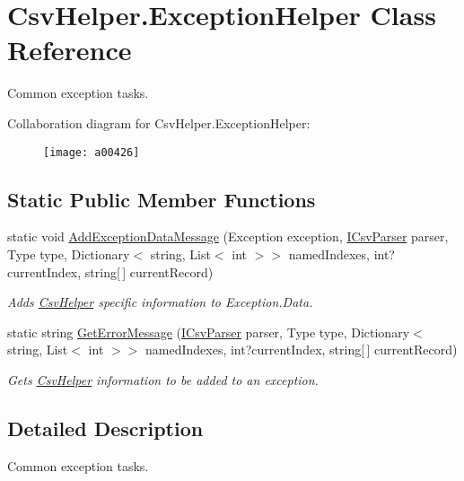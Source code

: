 \hypertarget{a00100}{\section{Csv\-Helper.\-Exception\-Helper Class Reference}
\label{a00100}
}


Common exception tasks.  




Collaboration diagram for Csv\-Helper.\-Exception\-Helper\-:
\nopagebreak
\begin{figure}[H]
\begin{center}
\leavevmode
\texttt{[image: a00426]}
\end{center}
\end{figure}
\subsection*{Static Public Member Functions}
\begin{DoxyCompactItemize}
\item 
static void \hyperlink{a00100_a7415ea84b6d462b9d61ecf2128282837}{Add\-Exception\-Data\-Message} (Exception exception, \hyperlink{a00110}{I\-Csv\-Parser} parser, Type type, Dictionary$<$ string, List$<$ int $>$$>$ named\-Indexes, int?current\-Index, string\mbox{[}$\,$\mbox{]} current\-Record)
\begin{DoxyCompactList}\small\item\em Adds \hyperlink{a00314}{Csv\-Helper} specific information to Exception.\-Data. \end{DoxyCompactList}\item 
static string \hyperlink{a00100_a11e421dc9f9fdb2b72d060a24471b5be}{Get\-Error\-Message} (\hyperlink{a00110}{I\-Csv\-Parser} parser, Type type, Dictionary$<$ string, List$<$ int $>$$>$ named\-Indexes, int?current\-Index, string\mbox{[}$\,$\mbox{]} current\-Record)
\begin{DoxyCompactList}\small\item\em Gets \hyperlink{a00314}{Csv\-Helper} information to be added to an exception. \end{DoxyCompactList}\end{DoxyCompactItemize}


\subsection{Detailed Description}
Common exception tasks. 



